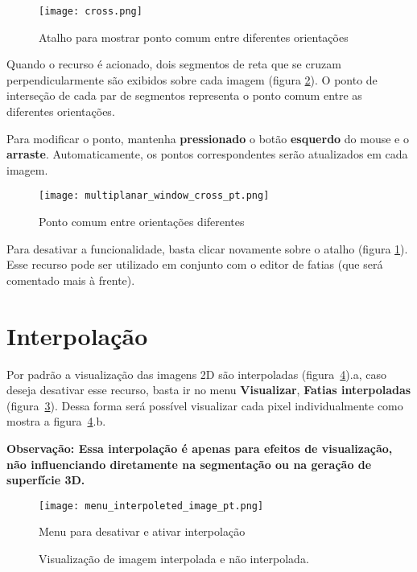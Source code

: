 \begin{figure}[!htb]
\centering
\texttt{[image: cross.png]}
\caption{Atalho para mostrar ponto comum entre diferentes orientações}
\label{fig:cross_icon}
\end{figure}

Quando o recurso é acionado, dois segmentos de reta que se cruzam perpendicularmente são exibidos
sobre cada imagem (figura \ref{fig:cross_all}). O ponto de interseção de cada par de segmentos
representa o ponto comum  entre as diferentes orientações.

\newpage

Para modificar o ponto, mantenha \textbf{pressionado} o botão \textbf{esquerdo} do mouse e o
\textbf{arraste}. Automaticamente, os pontos correspondentes serão atualizados em cada imagem.

\begin{figure}[!htb]
\centering
\texttt{[image: multiplanar\_window\_cross\_pt.png]}
\caption{Ponto comum entre orientações diferentes}
\label{fig:cross_all}
\end{figure}

Para desativar a funcionalidade, basta clicar novamente sobre o atalho (figura \ref{fig:cross_icon}).
Esse recurso pode ser utilizado em conjunto com o editor de fatias (que será comentado mais à frente).


\section{Interpolação}

Por padrão a visualização das imagens 2D são interpoladas (figura~\ref{fig:interp}).a, caso deseja desativar esse recurso, basta ir no menu \textbf{Visualizar}, \textbf{Fatias interpoladas} (figura~\ref{fig:menu_interpoleted_image_pt}). Dessa forma será possível visualizar cada pixel individualmente como mostra a figura~\ref{fig:interp}.b. 

\textbf{Observação: Essa interpolação é apenas para efeitos de visualização, não influenciando diretamente na segmentação ou na geração de superfície 3D.}

\begin{figure}[!htb]
\centering
\texttt{[image: menu\_interpoleted\_image\_pt.png]}
\caption{Menu para desativar e ativar interpolação}
\label{fig:menu_interpoleted_image_pt}
\end{figure}


\begin{figure}[!htb]
  \centering
    \qquad
  \hfill
  \caption{Visualização de imagem interpolada e não interpolada.}
  \label{fig:interp}
\end{figure}

